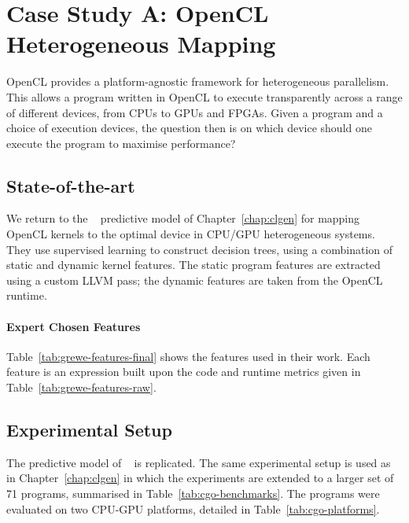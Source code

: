 \section{Case Study A: OpenCL Heterogeneous Mapping}
\label{sec:deeptune-case-study-a}

OpenCL provides a platform-agnostic framework for heterogeneous parallelism. This allows a program written in OpenCL to execute transparently across a range of different devices, from CPUs to GPUs and FPGAs. Given a program and a choice of execution devices, the question then is on which device should one execute the program to maximise performance?

\subsection{State-of-the-art}

We return to the \citeauthor{Grewe2013} ~\cite{Grewe2013} predictive model of Chapter~\ref{chap:clgen} for mapping OpenCL kernels to the optimal device in CPU/GPU heterogeneous systems. They use supervised learning to construct decision trees, using a combination of static and dynamic kernel features. The static program features are extracted using a custom LLVM pass; the dynamic features are taken from the OpenCL runtime.

\paragraph*{Expert Chosen Features}

Table~\ref{tab:grewe-features-final} shows the features used in their work. Each feature is an expression built upon the code and runtime metrics given in Table~\ref{tab:grewe-features-raw}.



\subsection{Experimental Setup}

The predictive model of \citeauthor{Grewe2013} ~\cite{Grewe2013} is replicated. The same experimental setup is used as in Chapter~\ref{chap:clgen} in which the experiments are extended to a larger set of 71 programs, summarised in Table~\ref{tab:cgo-benchmarks}. The programs were evaluated on two CPU-GPU platforms, detailed in Table~\ref{tab:cgo-platforms}.

